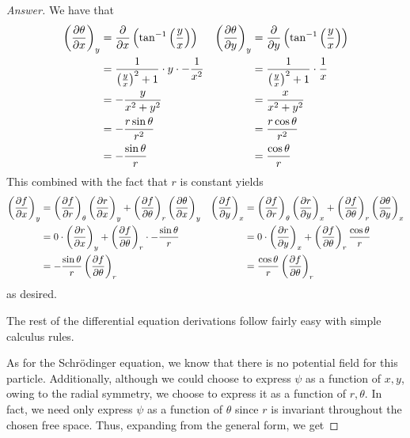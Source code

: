 \documentclass[../notes.tex]{subfiles}
\begin{document}
\begin{enumerate}[label={\textbf{5-\arabic*.}},ref={5-\arabic*}]
    \begin{proof}[Answer]
        We have that
        \begin{align*}
            \left( \pdv{\theta}{x} \right)_y &= \pdv{x}\left( \tan^{-1}\left( \frac{y}{x} \right) \right)&
                \left( \pdv{\theta}{y} \right)_y &= \pdv{y}\left( \tan^{-1}\left( \frac{y}{x} \right) \right)\\
            &= \frac{1}{\left( \frac{y}{x} \right)^2+1}\cdot y\cdot -\frac{1}{x^2}&
                &= \frac{1}{\left( \frac{y}{x} \right)^2+1}\cdot\frac{1}{x}\\
            &= -\frac{y}{x^2+y^2}&
                &= \frac{x}{x^2+y^2}\\
            &= -\frac{r\sin\theta}{r^2}&
                &= \frac{r\cos\theta}{r^2}\\
            &= -\frac{\sin\theta}{r}&
                &= \frac{\cos\theta}{r}
        \end{align*}
        This combined with the fact that $r$ is constant yields
        \begin{align*}
            \left( \pdv{f}{x} \right)_y &= \left( \pdv{f}{r} \right)_\theta\left( \pdv{r}{x} \right)_y+\left( \pdv{f}{\theta} \right)_r\left( \pdv{\theta}{x} \right)_y&
                \left( \pdv{f}{y} \right)_x &= \left( \pdv{f}{r} \right)_\theta\left( \pdv{r}{y} \right)_x+\left( \pdv{f}{\theta} \right)_r\left( \pdv{\theta}{y} \right)_x\\
            &= 0\cdot\left( \pdv{r}{x} \right)_y+\left( \pdv{f}{\theta} \right)_r\cdot -\frac{\sin\theta}{r}&
                &= 0\cdot\left( \pdv{r}{y} \right)_x+\left( \pdv{f}{\theta} \right)_r\frac{\cos\theta}{r}\\
            &= -\frac{\sin\theta}{r}\left( \pdv{f}{\theta} \right)_r&
                &= \frac{\cos\theta}{r}\left( \pdv{f}{\theta} \right)_r
        \end{align*}
        as desired.\par
        The rest of the differential equation derivations follow fairly easy with simple calculus rules.\par
        As for the Schr\"{o}dinger equation, we know that there is no potential field for this particle. Additionally, although we could choose to express $\psi$ as a function of $x,y$, owing to the radial symmetry, we choose to express it as a function of $r,\theta$. In fact, we need only express $\psi$ as a function of $\theta$ since $r$ is invariant throughout the chosen free space. Thus, expanding from the general form, we get

\end{proof}
\end{enumerate}
\end{document}
